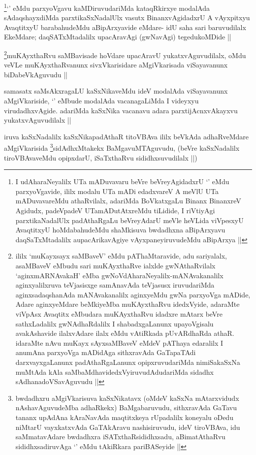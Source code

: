 \begin{artha}
\footnote{I udAharaNeyalilx UTa mADuvavaru beVre beVreyAgidadxrU `\stext' eMdu parxyoVgavide, ililx modalu UTa mADi edadxvareV A meVlU UTa mADuvavareMdu athaRvilalx, adariMda BoVkatxgaLu Binanx BinanxreV Agidudx, padeVpadeV UTamADutAtxreMdu tiLidide, I riVtiyAgi parxtikaNadalUlx padAthaRgaLu beVreyAdarU meVle heVLida viVpesxyU AvaqtitxyU hoMdabahudeMdu shaMkisuva bwdadhxna aBipArxyavu daqSaTxMtadalilx aupacArikavAgiye vAyxpaneyiruvudeMdu aBipArxya ||}`\stext' eMdu parxyoVgavu kaMDiruvudariMda kataqRkirxye modalAda sAdaqshayxdiMda parxtikaSxNadalUlx vasutx BinanxvAgidadxrU A vAyxpitxyu AvaqtitxyU barabahudeMdu aBipArxyavide eMdare- idU saha sari baruvudilalx EkeMdare; daqSATxMtadalilx upacAravAgi (gwNavAgi) tegedukoMDide ||
\end{artha}

\begin{artha}
\footnote{ililx `muKayxsayx saMBaveV' eMdu pAThaMtaravide, adu sariyalalx, asaMBaveV eMbudu sari muKAyxthaRve ialxlde gwNAthaRvilalx `aginxmARNAvakaH' eMba gwNoVdAharaNeyalilx-mANAvakanalilx aginxyalilxruva teVjasisxge samAnavAda teVjasusx iruvudariMda aginxsadaqshanAda mANAvakanalilx aginxyeMdu gwNa parxyoVga mADide, Adare aginxyeMdare beMkiyeMba muKAyxthaRvu idedxVyide, adaraMte viVpAsx Avaqtitx eMbudara muKAyxthaRvu idadxre mAtarx beVre sathxLadalilx gwNAdhaRdalilx I shabadxgaLanunx upayoVgisalu avakAshavide ilalxvAdare ilalx eMdu vAtiRkada pUvARdhaRda athaR. idaraMte nAvu muKayx sAyxsaMBaveV eMdeV pAThaya edaralilx I anumAna parxyoVga mADidAga sithxravAda GaTapaTAdi darxvayxgaLanunx padAthaRgaLanunx opipxruvudariMda nimiSakaSxNa muMtAda kAla saMbaMdhavidedxVyiruvudAdudariMda sidadhx sAdhanadoVSavAguvudu ||}muKAyxthaRvu saMBavisade hoVdare upacAravU yukatxvAguvudilalx, oMdu veVLe muKAyxthaRvanunx sivxVkarisidare aMgiVkarisada viSayavanunx biDabeVkAguvudu ||
\end{artha}

\begin{artha}
samasatx saMsAkxragaLU kaSxNikaveMdu ideV modalAda viSayavanunx aMgiVkariside, `\stext' eMbude modalAda vacanagaLiMda I videyxyu virudadhxvAgide. adariMda kaSxNika vacanavu adara parxtijAcnxvAkayxvu yukatxvAguvudilalx ||
\end{artha}

\begin{artha}
iruva kaSxNadalilx kaSxNikapadAthaR titoVBAva ililx beVkAda adhaRveMdare aMgiVkarisida \footnote{bwdadhxru aMgiVkarisuva kaSxNikatavx (oMdeV kaSxNa mAtarxvidudx nAshavAguvudeMba adhaRkekx) BaMgabaruvudu, sithxravAda GaTavu tananx upAdAna kAraNavAda maqtitxkeya rUpadalilx koneyalu oDedu niMtarU vayxkatxvAda GaTAkAravu nashisiruvudu, ideV tiroVBAva, idu saMmatavAdare bwdadhxra iSATxthaRsididhxsadu, aBimatAthaRvu sididhxsadiruvAga `\stext' eMdu tAkiRkara pariBASeyide ||}sidAdhxMtakekx BaMgavuMTAguvudu, (beVre kaSxNadalilx tiroVBAvaveMdu opipxdarU, iSaTxthaRvu sididhxsuvudilalx ||)
\end{artha}

